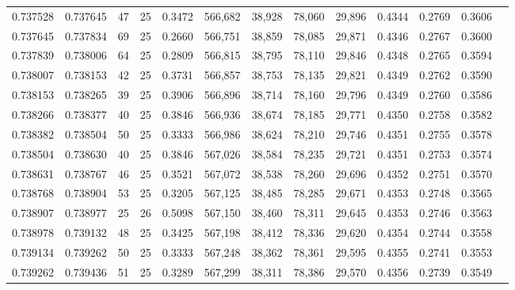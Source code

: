 \begin{tabular}{rrrrrrrrrrrrr}
0.737528 & 0.737645 &    47 &  25 &                                     0.3472 & 566,682 &  38,928 &  78,060 &  29,896 & 0.4344 & 0.2769 & 0.3606 \\
0.737645 & 0.737834 &    69 &  25 &                                     0.2660 & 566,751 &  38,859 &  78,085 &  29,871 & 0.4346 & 0.2767 & 0.3600 \\
0.737839 & 0.738006 &    64 &  25 &                                     0.2809 & 566,815 &  38,795 &  78,110 &  29,846 & 0.4348 & 0.2765 & 0.3594 \\
0.738007 & 0.738153 &    42 &  25 &                                     0.3731 & 566,857 &  38,753 &  78,135 &  29,821 & 0.4349 & 0.2762 & 0.3590 \\
0.738153 & 0.738265 &    39 &  25 &                                     0.3906 & 566,896 &  38,714 &  78,160 &  29,796 & 0.4349 & 0.2760 & 0.3586 \\
0.738266 & 0.738377 &    40 &  25 &                                     0.3846 & 566,936 &  38,674 &  78,185 &  29,771 & 0.4350 & 0.2758 & 0.3582 \\
0.738382 & 0.738504 &    50 &  25 &                                     0.3333 & 566,986 &  38,624 &  78,210 &  29,746 & 0.4351 & 0.2755 & 0.3578 \\
0.738504 & 0.738630 &    40 &  25 &                                     0.3846 & 567,026 &  38,584 &  78,235 &  29,721 & 0.4351 & 0.2753 & 0.3574 \\
0.738631 & 0.738767 &    46 &  25 &                                     0.3521 & 567,072 &  38,538 &  78,260 &  29,696 & 0.4352 & 0.2751 & 0.3570 \\
0.738768 & 0.738904 &    53 &  25 &                                     0.3205 & 567,125 &  38,485 &  78,285 &  29,671 & 0.4353 & 0.2748 & 0.3565 \\
0.738907 & 0.738977 &    25 &  26 &                                     0.5098 & 567,150 &  38,460 &  78,311 &  29,645 & 0.4353 & 0.2746 & 0.3563 \\
0.738978 & 0.739132 &    48 &  25 &                                     0.3425 & 567,198 &  38,412 &  78,336 &  29,620 & 0.4354 & 0.2744 & 0.3558 \\
0.739134 & 0.739262 &    50 &  25 &                                     0.3333 & 567,248 &  38,362 &  78,361 &  29,595 & 0.4355 & 0.2741 & 0.3553 \\
0.739262 & 0.739436 &    51 &  25 &                                     0.3289 & 567,299 &  38,311 &  78,386 &  29,570 & 0.4356 & 0.2739 & 0.3549 \\

\end{tabular}
